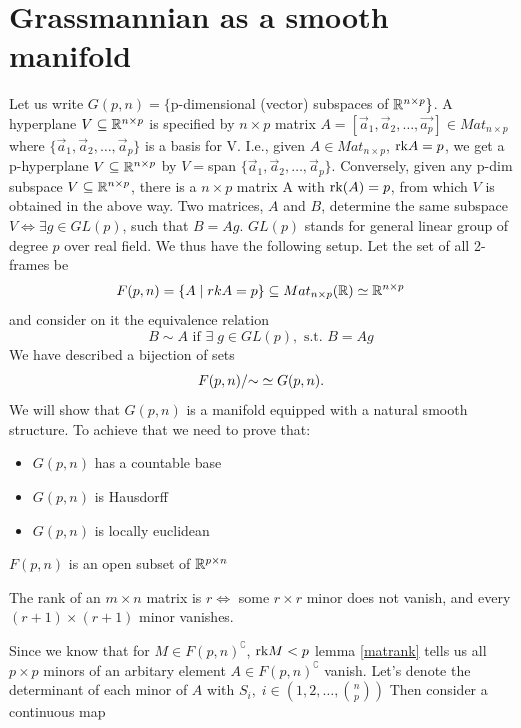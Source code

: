 \documentclass[11pt,a4paper]{report}
\begin{document}
\section{Grassmannian as a smooth manifold}
Let us write $G(p,n) = \{ $p-dimensional (vector) subspaces of $\mathbb{R}^{n \times p} \}$. A hyperplane $V \subseteq \mathbb{R}^{n \times p}$ is specified by $n \times p$ matrix $A=[\vec{a}_1,\vec{a}_2, \dots, \vec{a_p}] \in Mat_{n\times p}$ where 
$\{\vec{a}_1, \vec{a}_2, \dots , \vec{a}_p \}$ is a basis for V. I.e., given $A \in Mat_{n\times p}$, $\textrm{rk} A = p$, we get a p-hyperplane $V \subseteq \mathbb{R}^{n \times p}$ by $V= $span $\{\vec{a}_1,\vec{a}_2, \dots, \vec{a}_p \} $. Conversely, given any p-dim subspace $V\subseteq \mathbb{R}^{n \times p}$, there is a $n \times p$
matrix A with $\textrm{rk}(A)=p$, from which $V$ is obtained in the above way. Two matrices, $A$ and $B$, determine the same subspace $V \iff \exists g \in GL(p) $, such that $B = A g$. $GL(p)$ stands for general linear group of degree $p$ over real field.
\newline
We thus have the following setup. Let the set of all  2-frames be
$$ F(p,n) = \{ A \; | \;  rkA=p \} \subseteq Mat_{n \times p}(\mathbb{R})  \simeq \mathbb{R}^{n \times p} $$
and consider on it the equivalence relation
$$ B \sim A \text{ if } \exists \; g \in GL(p), \text{ s.t. } B=Ag $$
We have described a bijection of sets
$$ F(p,n)/{\sim} \simeq  G(p,n). $$ 
We will show that $G(p,n)$ is a manifold equipped with a natural smooth structure. To achieve that we need to prove that:
\begin{itemize}
    \item $G(p,n)$ has a countable base
    \item $G(p,n)$ is Hausdorff
    \item $G(p,n)$ is locally euclidean
\end{itemize}
\begin{Prop}
    $F(p,n)$ is an open subset of $\mathbb{R}^{p \times n}$
\end{Prop}
\begin{Lemma}\label{matrank}
    The rank of an $m \times n$ matrix is $r \iff$ some $r \times r$ minor does not vanish,
    and every $(r+1) \times (r+1)$ minor vanishes.
\end{Lemma}
Since we know that for $M \in F(p,n)^\complement$, $\textrm{rk} M <p$ lemma \ref{matrank} tells us all $p \times p$ minors
of an arbitary element $ A \in F(p,n)^\complement$ vanish. Let's denote the determinant of each minor of $A$ with $S_i, \; i\in (1,2, \dots ,  {n \choose p})$ 
Then consider a continuous map
\end{document}
